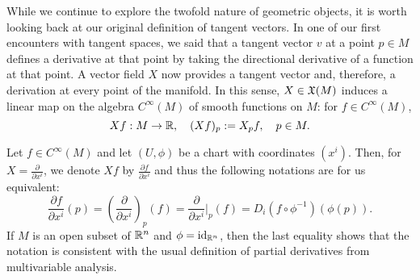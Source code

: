 

While we continue to explore the twofold nature of geometric objects, it is worth looking back at our original definition of tangent vectors.
In one of our first encounters with tangent spaces, we said that a tangent vector $v$ at a point $p\in M$ defines a derivative at that point by taking the directional derivative of a function at that point.
A vector field $X$ now provides a tangent vector and, therefore, a derivation at every point of the manifold.
In this sense, $X\in\mathfrak{X}(M)$ induces a linear map on the algebra $C^\infty(M)$ of smooth functions on $M$: for $f\in C^\infty(M)$,
\begin{equation}\label{eq:diff_directional_derivative}
  Xf : M\to\mathbb{R}, \quad
  (Xf)_p := X_p f, \quad p\in M.
\end{equation}

\begin{notation}\label{notation:derivative}
  Let $f\in C^\infty(M)$ and let $(U, \phi)$ be a chart with coordinates $(x^i)$.
  Then, for $X = \frac{\partial}{\partial x^i}$, we denote $Xf$ by $\frac{\partial f}{\partial x^i}$ and thus the following notations are for us equivalent:
  \begin{equation}
    \frac{\partial f}{\partial x^i}(p)
    = \left(\frac{\partial}{\partial x^i}\right)_p(f)
    = \frac{\partial}{\partial x^i}\Big|_p(f)
    = D_i(f\circ\phi^{-1})(\phi(p)).
  \end{equation}
  If $M$ is an open subset of $\mathbb{R}^n$ and $\phi=\operatorname{id}_{\mathbb{R}^n}$, then the last equality shows that the notation is consistent with the usual definition of partial derivatives from multivariable analysis.
\end{notation}

